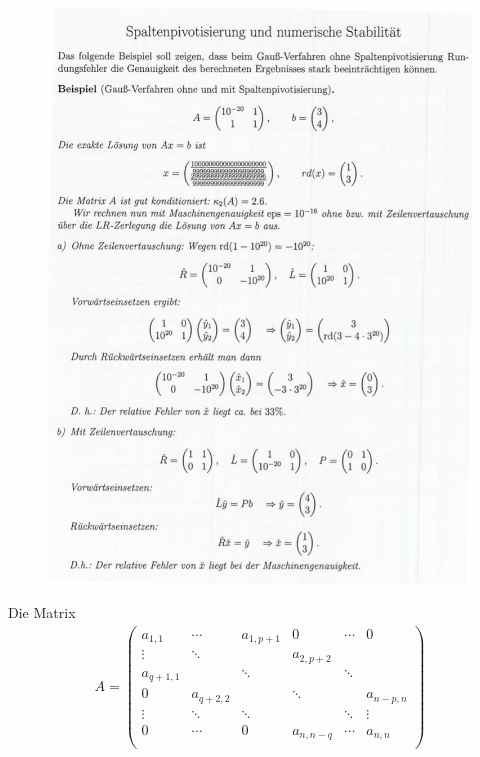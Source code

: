 \begin{figure}[htbp]
  \centering
  \includegraphics[width=\textwidth]{figures/spaltenpivotisierung.png}
\end{figure}
 Die Matrix
\begin{align*}
  A = \begin{pmatrix}
    a_{1,1} & \cdots & a_{1,p+1} & 0         & \cdots & 0\\
    \vdots  & \ddots &           & a_{2,p+2} & & \\
    a_{q+1,1} &      & \ddots    &           & \ddots & \\
    0       & a_{q+2,2} &        & \ddots    & & a_{n-p,n} \\
    \vdots  & \ddots & \ddots    &           & \ddots & \vdots \\
    0       & \cdots & 0         & a_{n,n-q} & \cdots & a_{n,n} \\
  \end{pmatrix}
\end{align*}
